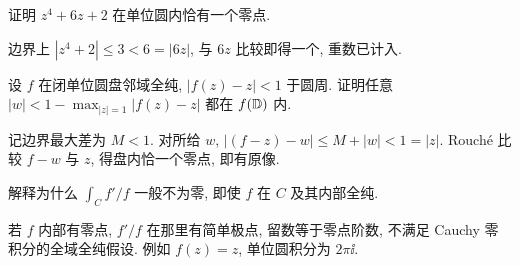 \begin{exercise}
证明 $z^4+6z+2$ 在单位圆内恰有一个零点.
\end{exercise}
\begin{solution}
边界上 $|z^4+2|\le3<6=|6z|$, 与 $6z$ 比较即得一个, 重数已计入.
\end{solution}
\begin{exercise}
设 $f$ 在闭单位圆盘邻域全纯, $|f(z)-z|<1$ 于圆周. 证明任意 $|w|<1-\max_{|z|=1}|f(z)-z|$ 都在 $f(\mathbb D)$ 内.
\end{exercise}
\begin{solution}
记边界最大差为 $M<1$. 对所给 $w$, $|(f-z)-w|\le M+|w|<1=|z|$. Rouché 比较 $f-w$ 与 $z$, 得盘内恰一个零点, 即有原像.
\end{solution}
\begin{exercise}
解释为什么 $\int_C f'/f$ 一般不为零, 即使 $f$ 在 $C$ 及其内部全纯.
\end{exercise}
\begin{solution}
若 $f$ 内部有零点, $f'/f$ 在那里有简单极点, 留数等于零点阶数, 不满足 Cauchy 零积分的全域全纯假设. 例如 $f(z)=z$, 单位圆积分为 $2\pi\ii$.
\end{solution}

